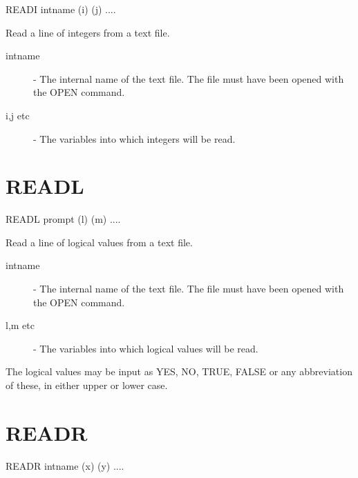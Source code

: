 \documentclass[twoside,11pt]{report}
\newcommand{\xlabel}[1]{}
\begin{document}
    READI \hspace{.5cm} intname \hspace{.5cm} (i) \hspace{.5cm} (j)  ....

 Read a line of integers from a text file.

\begin{description}

\item[intname]  -  The internal name of the text file. The file must have
                   been opened with the OPEN command.

\item[i,j etc] -  The variables into which integers will be read.

\end{description}

\section{\xlabel{READL}READL\label{READL}}


    READL \hspace{.5cm} prompt \hspace{.5cm} (l) \hspace{.5cm} (m)  ....

 Read a line of logical values from a text file.

\begin{description}

\item[intname]  -  The internal name of the text file. The file must have
                   been opened with the OPEN command.

\item[l,m etc] -  The variables into which logical values will be read.

\end{description}
The logical values may be input as YES, NO, TRUE, FALSE or any
abbreviation of these, in either upper or lower case.


\section{\xlabel{READR}READR\label{READR}}

    READR \hspace{.5cm} intname \hspace{.5cm} (x) \hspace{.5cm} (y)  ....
\end{document}
